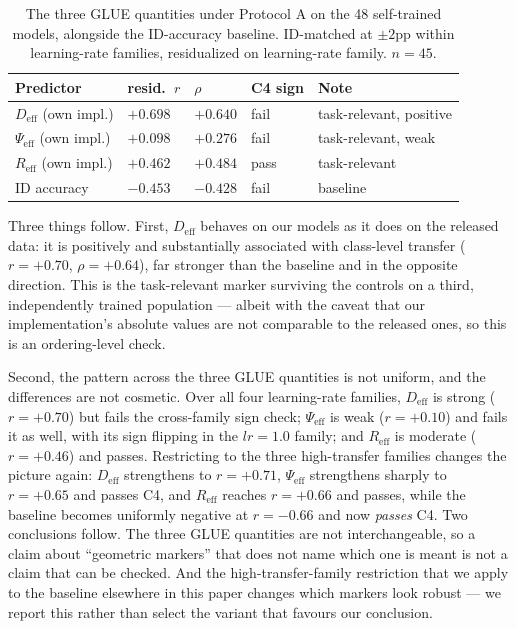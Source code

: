 \documentclass[10pt]{article} %
\begin{document}
\begin{table}[t]
\caption{The three GLUE quantities under Protocol A on the 48 self-trained models, alongside the ID-accuracy baseline. ID-matched at $\pm2$pp within learning-rate families, residualized on learning-rate family. $n=45$.}
\label{tab:glueown}
\centering
\small
\setlength{\tabcolsep}{4pt}
\begin{tabular}{@{}p{3.0cm}p{1.7cm}p{1.7cm}p{1.5cm}p{3.3cm}@{}}
\hline
Predictor & resid.\ $r$ & $\rho$ & C4 sign & Note \\
\hline
$D_{\mathrm{eff}}$ (own impl.) & $+0.698$ & $+0.640$ & fail & task-relevant, positive \\
$\Psi_{\mathrm{eff}}$ (own impl.) & $+0.098$ & $+0.276$ & fail & task-relevant, weak \\
$R_{\mathrm{eff}}$ (own impl.) & $+0.462$ & $+0.484$ & pass & task-relevant \\
ID accuracy & $-0.453$ & $-0.428$ & fail & baseline \\
\hline
\end{tabular}
\end{table}

Three things follow. First, $D_{\mathrm{eff}}$ behaves on our models as it does on the released data: it is positively and substantially associated with class-level transfer ($r=+0.70$, $\rho=+0.64$), far stronger than the baseline and in the opposite direction. This is the task-relevant marker surviving the controls on a third, independently trained population --- albeit with the caveat that our implementation's absolute values are not comparable to the released ones, so this is an ordering-level check.

Second, the pattern across the three GLUE quantities is not uniform, and the differences are not cosmetic. Over all four learning-rate families, $D_{\mathrm{eff}}$ is strong ($r=+0.70$) but fails the cross-family sign check; $\Psi_{\mathrm{eff}}$ is weak ($r=+0.10$) and fails it as well, with its sign flipping in the $lr=1.0$ family; and $R_{\mathrm{eff}}$ is moderate ($r=+0.46$) and passes. Restricting to the three high-transfer families changes the picture again: $D_{\mathrm{eff}}$ strengthens to $r=+0.71$, $\Psi_{\mathrm{eff}}$ strengthens sharply to $r=+0.65$ and passes C4, and $R_{\mathrm{eff}}$ reaches $r=+0.66$ and passes, while the baseline becomes uniformly negative at $r=-0.66$ and now \emph{passes} C4. Two conclusions follow. The three GLUE quantities are not interchangeable, so a claim about ``geometric markers'' that does not name which one is meant is not a claim that can be checked. And the high-transfer-family restriction that we apply to the baseline elsewhere in this paper changes which markers look robust --- we report this rather than select the variant that favours our conclusion.
\end{document}
